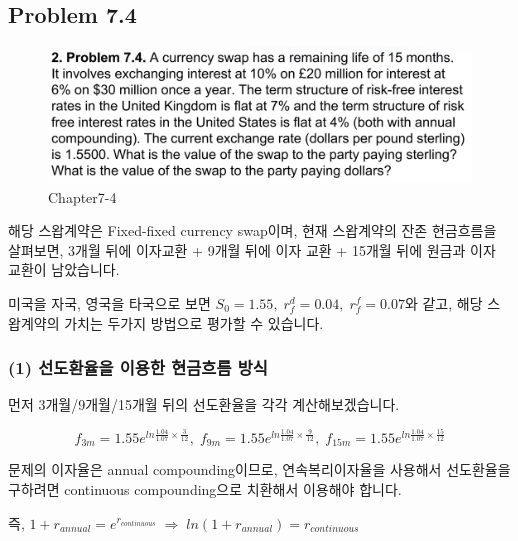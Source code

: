 \documentclass[
  letterpaper,
  DIV=11,
  numbers=noendperiod]{scrreprt}
\begin{document}
\subsection*{\texorpdfstring{\textbf{Problem
7.4}}{Problem 7.4}}\label{problem-7.4}

\begin{figure}[H]

{\centering \includegraphics{images/선물옵션_7-4.png}

}

\caption{Chapter7-4}

\end{figure}%

해당 스왑계약은 Fixed-fixed currency swap이며, 현재 스왑계약의 잔존
현금흐름을 살펴보면, 3개월 뒤에 이자교환 + 9개월 뒤에 이자 교환 + 15개월
뒤에 원금과 이자 교환이 남았습니다.

미국을 자국, 영국을 타국으로 보면
\(S_0=1.55,\;r_f^d=0.04,\;r_f^f=0.07\)와 같고, 해당 스왑계약의 가치는
두가지 방법으로 평가할 수 있습니다.

\subsubsection*{(1) 선도환율을 이용한 현금흐름
방식}\label{uxc120uxb3c4uxd658uxc728uxc744-uxc774uxc6a9uxd55c-uxd604uxae08uxd750uxb984-uxbc29uxc2dd}

먼저 3개월/9개월/15개월 뒤의 선도환율을 각각 계산해보겠습니다.

\[f_{3m}=1.55e^{ln\frac{1.04}{1.07}\times\frac{3}{12}},\;f_{9m}=1.55e^{ln\frac{1.04}{1.07}\times\frac{9}{12}},\;f_{15m}=1.55e^{ln\frac{1.04}{1.07}\times\frac{15}{12}}\]

\begin{tcolorbox}[enhanced jigsaw, titlerule=0mm, bottomtitle=1mm, left=2mm, title=\textcolor{quarto-callout-important-color}{\faExclamation}\hspace{0.5em}{Interest Compounding method}, toptitle=1mm, bottomrule=.15mm, colframe=quarto-callout-important-color-frame, breakable, opacityback=0, rightrule=.15mm, opacitybacktitle=0.6, coltitle=black, colback=white, arc=.35mm, colbacktitle=quarto-callout-important-color!10!white, toprule=.15mm, leftrule=.75mm]

문제의 이자율은 annual compounding이므로, 연속복리이자율을 사용해서
선도환율을 구하려면 continuous compounding으로 치환해서 이용해야 합니다.

즉,
\(1+r_{annual}=e^{r_{continuous}}\;\Rightarrow\;ln(1+r_{annual})=r_{continuous}\)

\end{tcolorbox}
\end{document}
